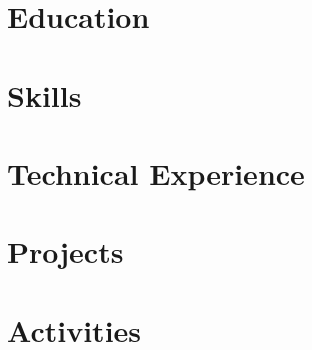 \documentclass[letter,10pt]{article}
\begin{document}
%
\section{Education}


\section{Skills}


\section{Technical Experience}



\section{Projects}


\section{Activities}

\end{document}
